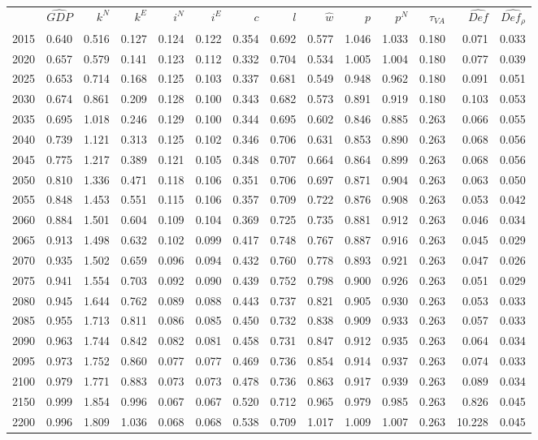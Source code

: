 \begin{tabular}{lrrrrrrrrrrrrr}
 & $\hat{GDP}$ & $k^N$ & $k^E$ & $i^N$ & $i^E$ & $c$ & $l$ & $\hat{w}$ & $p$ & $p^N$ & $\tau_{VA}$ & $\hat{Def}$ & $\hat{Def_\rho}$ \\
2015 & 0.640 & 0.516 & 0.127 & 0.124 & 0.122 & 0.354 & 0.692 & 0.577 & 1.046 & 1.033 & 0.180 & 0.071 & 0.033 \\
2020 & 0.657 & 0.579 & 0.141 & 0.123 & 0.112 & 0.332 & 0.704 & 0.534 & 1.005 & 1.004 & 0.180 & 0.077 & 0.039 \\
2025 & 0.653 & 0.714 & 0.168 & 0.125 & 0.103 & 0.337 & 0.681 & 0.549 & 0.948 & 0.962 & 0.180 & 0.091 & 0.051 \\
2030 & 0.674 & 0.861 & 0.209 & 0.128 & 0.100 & 0.343 & 0.682 & 0.573 & 0.891 & 0.919 & 0.180 & 0.103 & 0.053 \\
2035 & 0.695 & 1.018 & 0.246 & 0.129 & 0.100 & 0.344 & 0.695 & 0.602 & 0.846 & 0.885 & 0.263 & 0.066 & 0.055 \\
2040 & 0.739 & 1.121 & 0.313 & 0.125 & 0.102 & 0.346 & 0.706 & 0.631 & 0.853 & 0.890 & 0.263 & 0.068 & 0.056 \\
2045 & 0.775 & 1.217 & 0.389 & 0.121 & 0.105 & 0.348 & 0.707 & 0.664 & 0.864 & 0.899 & 0.263 & 0.068 & 0.056 \\
2050 & 0.810 & 1.336 & 0.471 & 0.118 & 0.106 & 0.351 & 0.706 & 0.697 & 0.871 & 0.904 & 0.263 & 0.063 & 0.050 \\
2055 & 0.848 & 1.453 & 0.551 & 0.115 & 0.106 & 0.357 & 0.709 & 0.722 & 0.876 & 0.908 & 0.263 & 0.053 & 0.042 \\
2060 & 0.884 & 1.501 & 0.604 & 0.109 & 0.104 & 0.369 & 0.725 & 0.735 & 0.881 & 0.912 & 0.263 & 0.046 & 0.034 \\
2065 & 0.913 & 1.498 & 0.632 & 0.102 & 0.099 & 0.417 & 0.748 & 0.767 & 0.887 & 0.916 & 0.263 & 0.045 & 0.029 \\
2070 & 0.935 & 1.502 & 0.659 & 0.096 & 0.094 & 0.432 & 0.760 & 0.778 & 0.893 & 0.921 & 0.263 & 0.047 & 0.026 \\
2075 & 0.941 & 1.554 & 0.703 & 0.092 & 0.090 & 0.439 & 0.752 & 0.798 & 0.900 & 0.926 & 0.263 & 0.051 & 0.029 \\
2080 & 0.945 & 1.644 & 0.762 & 0.089 & 0.088 & 0.443 & 0.737 & 0.821 & 0.905 & 0.930 & 0.263 & 0.053 & 0.033 \\
2085 & 0.955 & 1.713 & 0.811 & 0.086 & 0.085 & 0.450 & 0.732 & 0.838 & 0.909 & 0.933 & 0.263 & 0.057 & 0.033 \\
2090 & 0.963 & 1.744 & 0.842 & 0.082 & 0.081 & 0.458 & 0.731 & 0.847 & 0.912 & 0.935 & 0.263 & 0.064 & 0.034 \\
2095 & 0.973 & 1.752 & 0.860 & 0.077 & 0.077 & 0.469 & 0.736 & 0.854 & 0.914 & 0.937 & 0.263 & 0.074 & 0.033 \\
2100 & 0.979 & 1.771 & 0.883 & 0.073 & 0.073 & 0.478 & 0.736 & 0.863 & 0.917 & 0.939 & 0.263 & 0.089 & 0.034 \\
2150 & 0.999 & 1.854 & 0.996 & 0.067 & 0.067 & 0.520 & 0.712 & 0.965 & 0.979 & 0.985 & 0.263 & 0.826 & 0.045 \\
2200 & 0.996 & 1.809 & 1.036 & 0.068 & 0.068 & 0.538 & 0.709 & 1.017 & 1.009 & 1.007 & 0.263 & 10.228 & 0.045 \\
\end{tabular}
